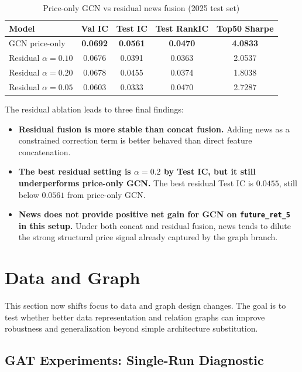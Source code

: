 \begin{table}[htbp]
\centering
\caption{Price-only GCN vs residual news fusion (2025 test set)}
\label{tab:gcn-residual-news-vs-price}
\begin{tabular}{lcccc}
\hline
Model & Val IC & Test IC & Test RankIC & Top50 Sharpe \\
\hline
GCN price-only & \textbf{0.0692} & \textbf{0.0561} & \textbf{0.0470} & \textbf{4.0833} \\
Residual $\alpha=0.10$ & 0.0676 & 0.0391 & 0.0363 & 2.0537 \\
Residual $\alpha=0.20$ & 0.0678 & 0.0455 & 0.0374 & 1.8038 \\
Residual $\alpha=0.05$ & 0.0603 & 0.0333 & 0.0470 & 2.7287 \\
\hline
\end{tabular}
\end{table}

The residual ablation leads to three final findings:
\begin{itemize}
\item \textbf{Residual fusion is more stable than concat fusion.} Adding news as a constrained correction term is better behaved than direct feature concatenation.
\item \textbf{The best residual setting is $\alpha=0.2$ by Test IC, but it still underperforms price-only GCN.} The best residual Test IC is $0.0455$, still below $0.0561$ from price-only GCN.
\item \textbf{News does not provide positive net gain for GCN on \texttt{future\_ret\_5} in this setup.} Under both concat and residual fusion, news tends to dilute the strong structural price signal already captured by the graph branch.
\end{itemize}

\section{Data and Graph}

This section now shifts focus to data and graph design changes. The goal is to test whether better data representation and relation graphs can improve robustness and generalization beyond simple architecture substitution.

\subsection{GAT Experiments: Single-Run Diagnostic}

